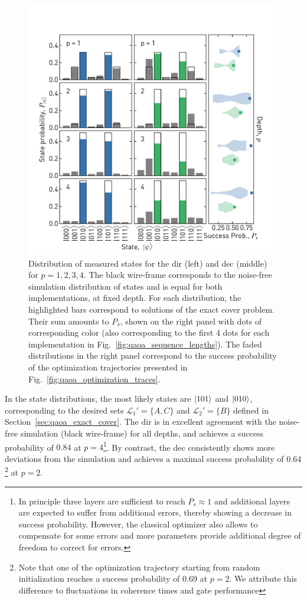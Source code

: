 \begin{figure}[ht]
    \centering
    \includegraphics[width=\textwidth]{chapters/qaoa/figs/ch5_qaoa_state_histograms_20200202_134816.pdf}
    \caption{Distribution of measured states for the \gls{dir} (left) and \gls{dec} (middle) for $p=1,2,3,4$. The black wire-frame corresponds to the noise-free simulation distribution of states and is equal for both implementations, at fixed depth. For each distribution, the highlighted bars correspond to solutions of the exact cover problem. Their sum amounts to $P_s$, shown on the right panel with dots of corresponding color (also corresponding to the first 4 dots for each implementation in Fig.~\ref{fig:qaoa_sequence_lengths}). The faded distributions in the right panel correspond to the success probability of the optimization trajectories presented in Fig.~\ref{fig:qaoa_optimization_traces}.}
    \label{fig:qaoa_state_histogram}
\end{figure}

In the state distributions, the most likely states are $\ket{101}$ and $\ket{010}$, corresponding to the desired sets $\mathcal{L}_1' = \{A,C\}$ and $\mathcal{L}_2' = \{B\}$ defined in Section~\ref{sec:qaoa_exact_cover}. The \gls{dir} is in excellent agreement with the noise-free simulation (black wire-frame) for all depths, and achieves a success probability of $0.84$ at $p=4$\footnote{In principle three layers are sufficient to reach $P_s \approx 1$ and additional layers are expected to suffer from additional errors, thereby showing a decrease in success probability. However, the classical optimizer also allows to compensate for some errors and more parameters provide additional degree of freedom to correct for errors.}. By contrast, the \gls{dec} consistently shows more deviations from the simulation and achieves a maximal success probability of $0.64$\footnote{Note that one of the optimization trajectory starting from random initialization reaches a success probability of $0.69$ at $p=2$. We attribute this difference to fluctuations in coherence times and gate performance} at $p=2$. 

